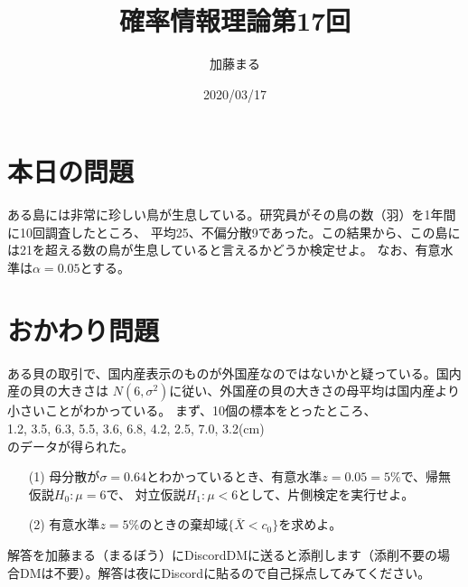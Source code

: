 \documentclass[a4j,uplatex,dvipdfmx]{jsarticle}
\title{確率情報理論第17回}
\author{加藤まる}
\date{2020/03/17}
\begin{document}
\maketitle

\section*{本日の問題}

ある島には非常に珍しい鳥が生息している。研究員がその鳥の数（羽）を1年間に10回調査したところ、
平均25、不偏分散9であった。この結果から、この島には21を超える数の鳥が生息していると言えるかどうか検定せよ。
なお、有意水準は$α=0.05$とする。


\section*{おかわり問題}
ある貝の取引で、国内産表示のものが外国産なのではないかと疑っている。国内産の貝の大きさは
$N(6,\sigma ^2)$に従い、外国産の貝の大きさの母平均は国内産より小さいことがわかっている。
まず、10個の標本をとったところ、\\
1.2, 3.5, 6.3, 5.5, 3.6, 6.8, 4.2, 2.5, 7.0, 3.2(cm)\\
のデータが得られた。
\begin{itemize}
  \item[(1)]母分散が$\sigma=0.64$とわかっているとき、有意水準$z=0.05=5\%$で、帰無仮説$H_0 : \mu=6$で、
  対立仮説$H_1 : \mu <6$として、片側検定を実行せよ。
  \item[(2)]有意水準$z=5\%$のときの棄却域$\{\bar {X}<c_0 \}$を求めよ。\\
\end{itemize}
解答を加藤まる（まるぼう）にDiscordDMに送ると添削します（添削不要の場合DMは不要）。解答は夜にDiscordに貼るので自己採点してみてください。
\end{document}
